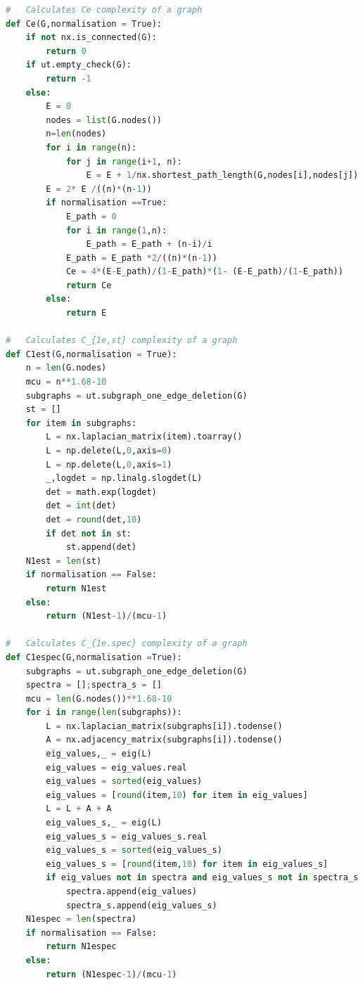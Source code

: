 \documentclass[12pt]{article}
\begin{document}
\begin{lstlisting}[language=Python,breaklines=true]
#   Calculates Ce complexity of a graph
def Ce(G,normalisation = True):
    if not nx.is_connected(G):
        return 0
    if ut.empty_check(G):
        return -1
    else:
        E = 0
        nodes = list(G.nodes())
        n=len(nodes)
        for i in range(n):
            for j in range(i+1, n):
                E = E + 1/nx.shortest_path_length(G,nodes[i],nodes[j])
        E = 2* E /((n)*(n-1))
        if normalisation ==True:
            E_path = 0
            for i in range(1,n):
                E_path = E_path + (n-i)/i
            E_path = E_path *2/((n)*(n-1))
            Ce = 4*(E-E_path)/(1-E_path)*(1- (E-E_path)/(1-E_path))
            return Ce
        else:
            return E

#   Calculates C_{1e,st} complexity of a graph
def C1est(G,normalisation = True):
    n = len(G.nodes)
    mcu = n**1.68-10
    subgraphs = ut.subgraph_one_edge_deletion(G)
    st = []
    for item in subgraphs:
        L = nx.laplacian_matrix(item).toarray()
        L = np.delete(L,0,axis=0)
        L = np.delete(L,0,axis=1)
        _,logdet = np.linalg.slogdet(L)
        det = math.exp(logdet)
        det = int(det)
        det = round(det,10)
        if det not in st:
            st.append(det)
    N1est = len(st)
    if normalisation == False:
        return N1est
    else:
        return (N1est-1)/(mcu-1)

#   Calculates C_{1e.spec} complexity of a graph
def C1espec(G,normalisation =True):
    subgraphs = ut.subgraph_one_edge_deletion(G)
    spectra = [];spectra_s = []
    mcu = len(G.nodes())**1.68-10
    for i in range(len(subgraphs)):
        L = nx.laplacian_matrix(subgraphs[i]).todense()
        A = nx.adjacency_matrix(subgraphs[i]).todense()
        eig_values,_ = eig(L)
        eig_values = eig_values.real
        eig_values = sorted(eig_values)
        eig_values = [round(item,10) for item in eig_values]
        L = L + A + A
        eig_values_s,_ = eig(L)
        eig_values_s = eig_values_s.real
        eig_values_s = sorted(eig_values_s)
        eig_values_s = [round(item,10) for item in eig_values_s]
        if eig_values not in spectra and eig_values_s not in spectra_s:
            spectra.append(eig_values)
            spectra_s.append(eig_values_s)
    N1espec = len(spectra)
    if normalisation == False:
        return N1espec
    else:
        return (N1espec-1)/(mcu-1)


\end{lstlisting}
\end{document}
